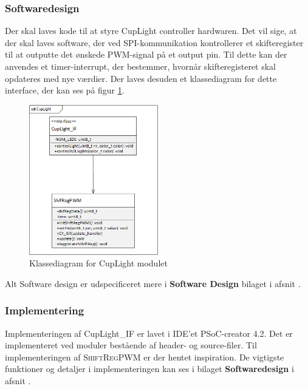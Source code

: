 \documentclass[Rapport/Rapport_main.tex]{subfiles}
\begin{document}
\subsubsection{Softwaredesign}
Der skal laves kode til at styre CupLight controller hardwaren. Det vil sige, at der skal laves software, der ved SPI-kommunikation kontrollerer et skifteregister til at outputte det ønskede PWM-signal på et output pin. Til dette kan der anvendes et timer-interrupt, der bestemmer, hvornår skifteregisteret skal opdateres med nye værdier. Der laves desuden et klassediagram for dette interface, der kan ses på figur \ref{fig:rap_cd_cuplight}.
\begin{figure}[H]
    \centering
    \includegraphics[width=0.5\textwidth]{Softwaredesign/CupLight_IF/graphics/CD_CupLight.png}
    \caption{Klassediagram for CupLight modulet}
    \label{fig:rap_cd_cuplight}
\end{figure}
Alt Software design er udspecificeret mere i \textbf{Software Design} bilaget i afsnit .
\subsubsection{Implementering}
Implementeringen af CupLight\_IF er lavet i IDE'et PSoC-creator 4.2. Det er implementeret ved moduler bestående af header- og source-filer. Til implementeringen af \textsc{ShiftRegPWM} er der hentet inspiration\cite{shiftregpwm}. De vigtigste funktioner og detaljer i implementeringen kan ses i bilaget \textbf{Softwaredesign} i afsnit .
\end{document}

